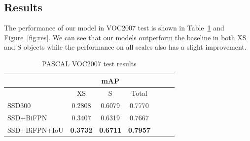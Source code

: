 \documentclass[journal,conference]{IEEEtran}
\begin{document}
\subsection{Results}
The performance of our model in VOC2007 test is shown in Table~\ref{tab:res} and Figure~\ref{fig:res}. We can see that our models outperform the baseline in both XS and S objects while the performance on all scales also has a slight improvement.

\begin{table}[htbp]
  \centering
  \caption{PASCAL VOC2007 test results}\label{tab:res}
  \begin{tabular}{|l|c|c|c|c|c|c|}
    \hline
     & \multicolumn{3}{|c|}{mAP}    \\
    \hline
                  & XS     & S      & Total \\
    \hline
    SSD300        & 0.2808 & 0.6079 & 0.7770 \\
    SSD+BiFPN     & 0.3407 & 0.6319 & 0.7667  \\
    SSD+BiFPN+IoU & \textbf{0.3732} & \textbf{0.6711} & \textbf{0.7957}\\
    \hline
  \end{tabular}
\end{table}
\end{document}
